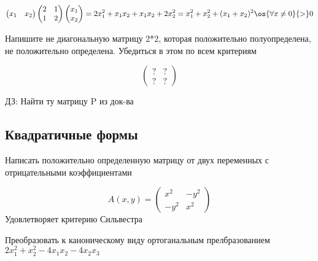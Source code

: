 \documentclass[12pt, fleqn]{article}
\begin{document}
    \begin{Sol}
      \[\begin{pmatrix}
        x_1 & x_2
    \end{pmatrix}\begin{pmatrix}
        2 & 1\\
        1 & 2
      \end{pmatrix} \begin{pmatrix}
        x_1\\
        x_2
      \end{pmatrix} = 2x_1^2 + x_1 x_2 + x_1 x_2 + 2x_2^2 = x_1^2 + x_2^2 + (x_1 + x_2)^2 \os{\forall x \neq 0}{>} 0\]
    \end{Sol}

    \begin{task}
      Напишите не диагональную матрицу 2*2, которая положительно полуопределена, не положительно определена. Убедиться в этом по всем критериям
    \end{task}

    \begin{Sol}
      \[\begin{pmatrix}
        ? & ?\\
        ? & ?
      \end{pmatrix}\]
    \end{Sol}

    ДЗ: Найти ту матрицу P из док-ва

    \subsection{Квадратичные формы}

    \begin{task}
      Написать положительно определенную матрицу от двух переменных с отрицательными коэффициентами
    \end{task}

    \begin{Sol}
      \[A(x,y)=\begin{pmatrix}
        x^2 & -y^2\\
        -y^2 & x^2
      \end{pmatrix}\]
      Удовлетворяет критерию Сильвестра
    \end{Sol}

    \begin{task}
      Преобразовать к каноническому виду ортоганальным прелбразованием $2x_1^2 + x_2^2 - 4x_1 x_2 - 4x_2 x_3$
    \end{task}
\end{document}

